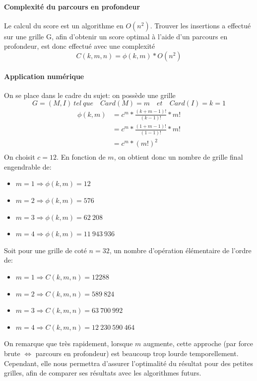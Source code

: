 \documentclass[10pt]{article}
\begin{document}
	\paragraph{Complexité du parcours en profondeur}
	  Le calcul du score est un algorithme en $O(n^2)$.
	  Trouver les insertions a effectué sur une grille G, afin d'obtenir un score optimal à l'aide d'un parcours en profondeur,
	  est donc effectué avec une complexité
	  $$\boxed{C(k, m, n) = \phi(k, m) * O(n^2)}$$
	
	\paragraph{Application numérique}
	  On se place dans le cadre du sujet: on possède une grille $$G=(M, I)\ tel\ que \quad Card(M)=m \quad et \quad Card(I)=k=1$$
	  \begin{equation} \label{eq1}
	    \begin{split}
	      \phi(k, m) & = c^m * \frac{(k + m - 1)!}{(k - 1)!} * m! \\
			& = c^m * \frac{(1 + m - 1)!}{(1 - 1)!} * m! \\
			& = c^m * (m!)^2 \\
	    \end{split}
	  \end{equation}
	  On choisit $c = 12$.
	  \newline
	  En fonction de $m$, on obtient donc un nombre de grille final engendrable de:
	  \begin{itemize}[label=-]
	    \item $m=1 \Rightarrow \phi(k, m) = 12$
	    \item $m=2 \Rightarrow \phi(k, m) = 576$
	    \item $m=3 \Rightarrow \phi(k, m) = 62\ 208$
	    \item $m=4 \Rightarrow \phi(k, m) = 11\ 943\ 936$
	  \end{itemize}
	  Soit pour une grille de coté $n=32$, un nombre d'opération élémentaire de l'ordre de:
	  \begin{itemize}[label=-]
	    \item $m=1 \Rightarrow C(k, m, n) = 12288$
	    \item $m=2 \Rightarrow C(k, m, n) = 589\ 824$
	    \item $m=3 \Rightarrow C(k, m, n) = 63\ 700\ 992$
	    \item $m=4 \Rightarrow C(k, m, n) = 12\ 230\ 590\ 464$
	  \end{itemize}
	  On remarque que très rapidement, lorsque $m$ augmente, cette approche (par force brute $\Leftrightarrow$ parcours en profondeur)
	  est beaucoup trop lourde temporellement.
	  Cependant, elle nous permettra d'assurer l'optimalité du résultat pour des petites grilles,
	  afin de comparer ses résultats avec les algorithmes futurs.
\end{document}
